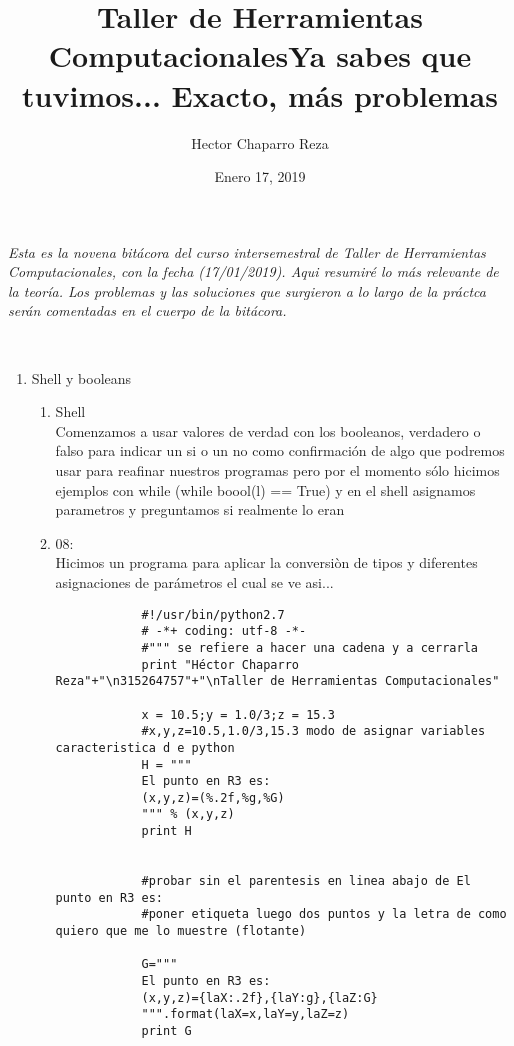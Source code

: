 \documentclass[letterpaper, 12pt, oneside]{article}
\title{\Huge{Taller de Herramientas Computacionales}}
\author{Hector Chaparro Reza}
\date{Enero 17, 2019}
\begin{document}
	\maketitle
	\it Esta es la novena bit\'acora del curso intersemestral de Taller de Herramientas Computacionales, con la fecha (17/01/2019). Aqui resumir\'e lo m\'as relevante de la teor\'ia. Los problemas y las soluciones que surgieron a lo largo de la pr\'actca ser\'an comentadas en el cuerpo de la bit\'acora.\\
	\newpage
	
	
	\title{\Huge{Ya sabes que tuvimos... Exacto, más problemas}}\\

	
	\begin{enumerate}
		\item {Shell y booleans}
		\begin{enumerate}
			\item Shell\\
			Comenzamos a usar valores de verdad  con los booleanos, verdadero o falso para indicar un si o un no como confirmación de algo que podremos usar para reafinar nuestros programas pero por el momento sólo hicimos ejemplos con while (while boool(l) == True) y en el shell asignamos parametros y preguntamos si realmente lo eran\\
			
			\item 08:\\
			Hicimos un programa para aplicar la conversiòn de tipos y diferentes asignaciones de parámetros el cual se ve asi... \\
			
			\begin{verbatim}
			#!/usr/bin/python2.7
			# -*+ coding: utf-8 -*-
			#""" se refiere a hacer una cadena y a cerrarla
			print "Héctor Chaparro Reza"+"\n315264757"+"\nTaller de Herramientas Computacionales" 
			
			x = 10.5;y = 1.0/3;z = 15.3
			#x,y,z=10.5,1.0/3,15.3 modo de asignar variables caracteristica d e python
			H = """
			El punto en R3 es:
			(x,y,z)=(%.2f,%g,%G)
			""" % (x,y,z)
			print H
			
			
			#probar sin el parentesis en linea abajo de El punto en R3 es:
			#poner etiqueta luego dos puntos y la letra de como quiero que me lo muestre (flotante)
			
			G="""
			El punto en R3 es:
			(x,y,z)={laX:.2f},{laY:g},{laZ:G} 
			""".format(laX=x,laY=y,laZ=z)
			print G
			

\end{verbatim}
\end{enumerate}
\end{enumerate}
\end{document}

